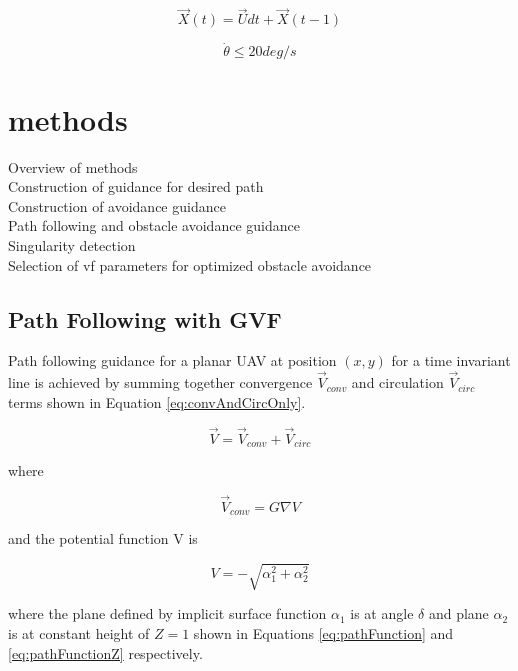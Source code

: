 \documentclass[conf]{new-aiaa}
\begin{document}
\begin{equation}
\label{uavPosition}
\overrightarrow{X}(t) = \overrightarrow{U}dt + \overrightarrow{X}(t-1)
\end{equation}


\begin{equation}
\label{turnRate}
\dot{\theta} \leq 20 deg/s
\end{equation}




\section{methods}
Overview of methods \\
Construction of guidance for desired path \\
Construction of avoidance guidance \\
Path following and obstacle avoidance guidance \\
Singularity detection \\
Selection of vf parameters for optimized obstacle avoidance \\

\subsection{Path Following with GVF}
Path following guidance for a planar UAV at position $(x,y)$ for a time invariant line is achieved by summing together convergence $\overrightarrow{V}_{conv}$ and circulation $\overrightarrow{V}_{circ}$ terms shown in Equation \ref{eq:convAndCircOnly}.

\begin{equation}
\label{eq:convAndCircOnly}
\overrightarrow{V} = \overrightarrow{V}_{conv} + \overrightarrow{V}_{circ} 
\end{equation}

where

\begin{equation}
\label{eq:timeInvariantPath}
 \overrightarrow{V}_{conv} = G \nabla V
\end{equation}

and the potential function V is

\begin{equation}
\label{potentialFunction}
V = -\sqrt{\alpha_1^2+\alpha_2^2}
\end{equation}


where the plane defined by implicit surface function $\alpha_1$ is at angle $\delta$ and plane $\alpha_2$ is at constant height of $Z = 1$ shown in Equations \ref{eq:pathFunction} and \ref{eq:pathFunctionZ} respectively.
\end{document}
